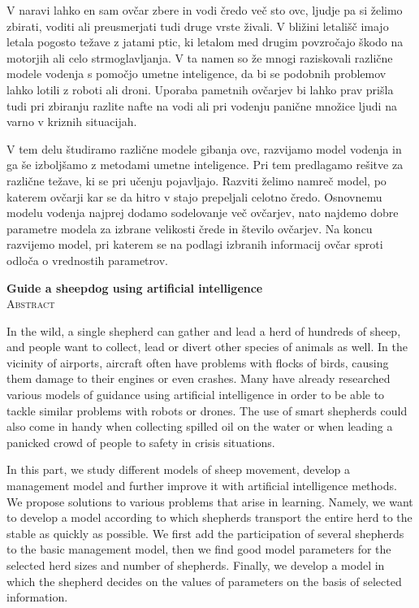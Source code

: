 \documentclass[12pt,a4paper,twoside]{article}
\theoremstyle{definition}
\theoremstyle{plain}
\numberwithin{equation}{section}
\begin{document}
V naravi lahko en sam ovčar zbere in vodi čredo več sto ovc, ljudje pa si želimo zbirati, voditi ali preusmerjati tudi druge vrste živali. V bližini letališč imajo letala pogosto težave z jatami ptic, ki letalom med drugim povzročajo škodo na motorjih ali celo strmoglavljanja. V ta namen so že mnogi raziskovali različne modele vodenja s pomočjo umetne inteligence, da bi se podobnih problemov lahko lotili z roboti ali droni. Uporaba pametnih ovčarjev bi lahko prav prišla tudi pri zbiranju razlite nafte na vodi ali pri vodenju panične množice ljudi na varno v kriznih situacijah.

V tem delu študiramo različne modele gibanja ovc, razvijamo model vodenja in ga še izboljšamo z metodami umetne inteligence. Pri tem predlagamo rešitve za različne težave, ki se pri učenju pojavljajo. Razviti želimo namreč model, po katerem ovčarji kar se da hitro v stajo prepeljali celotno čredo. Osnovnemu modelu vodenja najprej dodamo sodelovanje več ovčarjev, nato najdemo dobre parametre modela za izbrane velikosti črede in število ovčarjev. Na koncu razvijemo model, pri katerem se na podlagi izbranih informacij ovčar sproti odloča o vrednostih parametrov.

\vfill
\begin{center}
\textbf{Guide a sheepdog using artificial intelligence} \\[3mm]
\textsc{Abstract}\\[2mm]
\end{center}

In the wild, a single shepherd can gather and lead a herd of hundreds of sheep, and people want to collect, lead or divert other species of animals as well. In the vicinity of airports, aircraft often have problems with flocks of birds, causing them damage to their engines or even crashes. Many have already researched various models of guidance using artificial intelligence in order to be able to tackle similar problems with robots or drones. The use of smart shepherds could also come in handy when collecting spilled oil on the water or when leading a panicked crowd of people to safety in crisis situations.

In this part, we study different models of sheep movement, develop a management model and further improve it with artificial intelligence methods. We propose solutions to various problems that arise in learning. Namely, we want to develop a model according to which shepherds transport the entire herd to the stable as quickly as possible. We first add the participation of several shepherds to the basic management model, then we find good model parameters for the selected herd sizes and number of shepherds. Finally, we develop a model in which the shepherd decides on the values of parameters on the basis of selected information.
\end{document}
